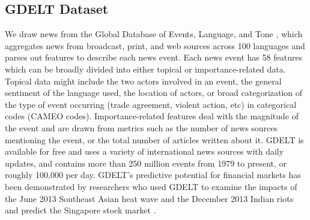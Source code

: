 \subsection{GDELT Dataset}
We draw news from the Global Database of Events, Language, and Tone \cite{GDELT}, which aggregates news from broadcast, print, and web sources across 100 languages and parses out features to describe each news event. Each news event has 58 features which can be broadly divided into either topical or importance-related data. Topical data might include the two actors involved in an event, the general sentiment of the language used, the location of actors, or broad categorization of the type of event occurring (trade agreement, violent action, etc) in categorical codes (CAMEO codes). Importance-related features deal with the magnitude of the event and are drawn from metrics such as the number of news sources mentioning the event, or the total number of articles written about it. GDELT is available for free and uses a variety of international news sources with daily updates, and contains more than 250 million events from 1979 to present, or roughly 100,000 per day. GDELT's predictive potential for financial markets has been demonstrated by researchers who used GDELT to examine the impacts of the June 2013 Southeast Asian heat wave and the December 2013 Indian riots and predict the Singapore stock market \cite{phua2014visual}.
